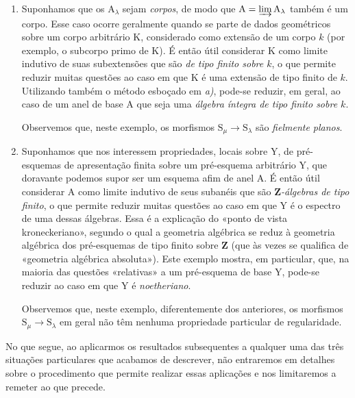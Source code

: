 \begin{env}[8.1.2]
\begin{enumerate}[label=\emph{\alph*)}]
Observemos que, no exemplo aqui considerado, os morfismos $\mathrm{S}_\mu\to\mathrm{S}_\lambda$ (para $\lambda\leqslant\mu$) são as \emph{imersões abertas} canônicas $\mathrm{U}_\mu\hookrightarrow\mathrm{U}_\lambda$ e, \emph{a fortiori}, são morfismos \emph{planos} (embora em geral não sejam fielmente planos), o que explica o interesse dos enunciados que recorrem a tal restrição.

  \item
  Suponhamos que os $\mathrm{A}_\lambda$ sejam \emph{corpos}, de modo que $\mathrm{A}=\varinjlim\mathrm{A}_\lambda$ também é um corpo.
Esse caso ocorre geralmente quando se parte de dados geométricos sobre um corpo arbitrário $\mathrm{K}$, considerado como extensão de um corpo $k$ (por exemplo, o subcorpo primo de $\mathrm{K}$).
É então útil considerar $\mathrm{K}$ como limite indutivo de suas subextensões que são \emph{de tipo finito sobre $k$}, o que permite reduzir muitas questões ao caso em que $\mathrm{K}$ é uma extensão de tipo finito de $k$.
Utilizando também o método esboçado em \emph{a)}, pode-se reduzir, em geral, ao caso de um anel de base $\mathrm{A}$ que seja uma \emph{álgebra íntegra de tipo finito sobre $k$}.

Observemos que, neste exemplo, os morfismos $\mathrm{S}_\mu\to\mathrm{S}_\lambda$ são \emph{fielmente planos}.

  \item
  Suponhamos que nos interessem propriedades, locais sobre $\mathrm{Y}$, de pré-esquemas de apresentação finita sobre um pré-esquema arbitrário $\mathrm{Y}$, que doravante podemos supor ser um esquema afim de anel $\mathrm{A}$.
É então útil considerar $\mathrm{A}$ como limite indutivo de seus subanéis que são \emph{$\mathbf{Z}$-álgebras de tipo finito}, o que permite reduzir muitas questões ao caso em que $\mathrm{Y}$ é o espectro de uma dessas álgebras.
Essa é a explicação do «ponto de vista kroneckeriano», segundo o qual a geometria algébrica se reduz à
geometria algébrica dos pré-esquemas de tipo finito sobre $\mathbf{Z}$ (que às vezes se qualifica de «geometria algébrica absoluta»).
Este exemplo mostra, em particular, que, na maioria das questões «relativas» a um pré-esquema de base $\mathrm{Y}$, pode-se reduzir ao caso em que $\mathrm{Y}$ é \emph{noetheriano}.

Observemos que, neste exemplo, diferentemente dos anteriores, os morfismos $\mathrm{S}_\mu\to\mathrm{S}_\lambda$ em geral não têm nenhuma propriedade particular de regularidade.
\end{enumerate}

No que segue, ao aplicarmos os resultados subsequentes a qualquer uma das três situações particulares que acabamos de descrever, não entraremos em detalhes sobre o procedimento que permite realizar essas aplicações e nos limitaremos a remeter ao que precede.
\end{env}

